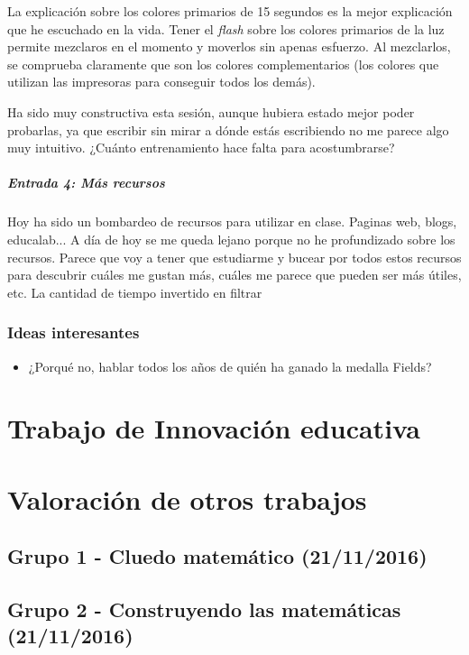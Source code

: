 \documentclass[palatino,nochap,miniheader]{apuntesURJC}
\begin{document}
La explicación sobre los colores primarios de 15 segundos es la mejor explicación que he escuchado en la vida. 
%
Tener el \textit{flash} sobre los colores primarios de la luz permite mezclaros en el momento y moverlos sin apenas esfuerzo. 
%
Al mezclarlos, se comprueba claramente que son los colores complementarios (los colores que utilizan las impresoras para conseguir todos los demás).

Ha sido muy constructiva esta sesión, aunque hubiera estado mejor poder probarlas, ya que escribir sin mirar a dónde estás escribiendo no me parece algo muy intuitivo. 
%
¿Cuánto entrenamiento hace falta para acostumbrarse?

\paragraph{Entrada 4: Más recursos}

Hoy ha sido un bombardeo de recursos para utilizar en clase. Paginas web, blogs, educalab... 
%
A día de hoy se me queda lejano porque no he profundizado sobre los recursos. 
%
Parece que voy a tener que estudiarme y bucear por todos estos recursos para descubrir cuáles me gustan más, cuáles me parece que pueden ser más útiles, etc.
%
La cantidad de tiempo invertido en filtrar 



\subsection{Ideas interesantes}

\begin{itemize}
	\item ¿Porqué no, hablar todos los años de quién ha ganado la medalla Fields?
\end{itemize}



\chapter{Trabajo de Innovación educativa}



\chapter{Valoración de otros trabajos}
\section{Grupo 1 - Cluedo matemático (21/11/2016)}
\section{Grupo 2 - Construyendo las matemáticas (21/11/2016)}





\printindex
\end{document}
